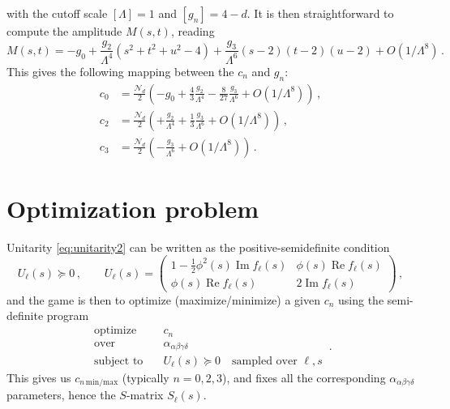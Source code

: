 with the cutoff scale $[\Lambda]=1$ and $[g_n]=4-d$. It is then straightforward to compute the amplitude $M(s,t)$, reading
\begin{equation}
M(s,t)=-g_0
+\frac{g_2}{\Lambda^4}\left(s^2+t^2+u^2-4\right)
+\frac{g_3}{\Lambda^6}(s-2)(t-2)(u-2)
+O\left(1/\Lambda^8\right)\,.
\end{equation}
This gives the following mapping between the $c_n$ and $g_n$:
\begin{equation}
\begin{aligned}
c_0 & = \frac{\mathcal{N}_d}{2}\left(-g_0+\frac{4}{3}\frac{g_2}{\Lambda^4}-\frac{8}{27}\frac{g_3}{\Lambda^6}+O\left(1/\Lambda^8\right)\right)\,, \\
c_2 & = \frac{\mathcal{N}_d}{2}\left(+\frac{g_2}{\Lambda^4}+\frac{1}{3}\frac{g_3}{\Lambda^6}+O\left(1/\Lambda^8\right)\right) \,, \\
c_3 & = \frac{\mathcal{N}_d}{2}\left(-\frac{g_3}{\Lambda^6}+O\left(1/\Lambda^8\right)\right) \,.
\end{aligned}
\end{equation}



\section*{Optimization problem}
Unitarity \eqref{eq:unitarity2} can be written as the positive-semidefinite condition
\begin{equation}
U_\ell(s)\succeq0\,, \qquad
U_\ell(s)=\begin{pmatrix}
1-\frac{1}{2}\phi^2(s)\operatorname{Im} f_\ell(s) &
\phi(s)\operatorname{Re}f_\ell(s)  \\
\phi(s)\operatorname{Re}f_\ell(s) &
2\operatorname{Im}f_\ell(s)
\end{pmatrix}\,,
\end{equation}
and the game is then to optimize (maximize/minimize) a given $c_n$ using the semi-definite program 
\begin{equation}
\begin{aligned}
\text{optimize} \quad & c_n \\
\text{over} \quad & \alpha_{\alpha\beta\gamma\delta} \\
\text{subject to} \quad & U_\ell(s)\succeq 0 \quad \text{sampled over }\ell, s
\end{aligned}\,.
\end{equation}
This gives us $c_{n\,\mathrm{min/max}}$ (typically $n=0,2,3$), and fixes all the corresponding $\alpha_{\alpha\beta\gamma\delta}$ parameters, hence the $S$-matrix $S_\ell(s)$.




